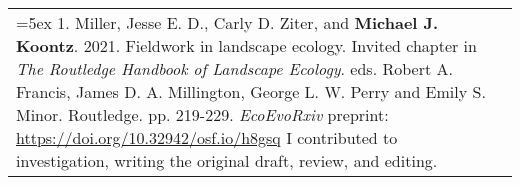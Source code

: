 \begin{longtable}{@{} >{\raggedright}p{6.10in} >{\raggedleft}X @{}}

\hangindent=5ex 1. Miller, Jesse E. D., Carly D. Ziter, and \textbf{Michael J. Koontz}. 2021. Fieldwork in landscape ecology. Invited chapter in \emph{The Routledge Handbook of Landscape Ecology}. eds. Robert A. Francis, James D. A. Millington, George L. W. Perry and Emily S. Minor. Routledge. pp. 219-229. \newline \emph{EcoEvoRxiv} preprint: \href{https://doi.org/10.32942/osf.io/h8gsq}{https://doi.org/10.32942/osf.io/h8gsq} 
\newline I contributed to investigation, writing the original draft, review, and editing. & \tabularnewline

\end{longtable}
 